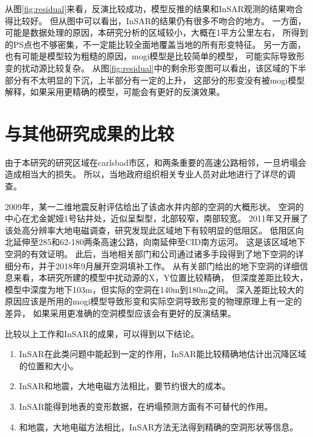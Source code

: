 从图\ref{fig:residual}来看，反演比较成功，模型反推的结果和InSAR观测的结果吻合得比较好。
但从图中可以看出，InSAR的结果仍有很多不吻合的地方。
一方面，可能是数据处理的原因，本研究分析的区域较小，大概在1平方公里左右，
所得到的PS点也不够密集，不一定能比较全面地覆盖当地的所有形变特征。
另一方面，也有可能是模型较为粗糙的原因，mogi模型是比较简单的模型，
可能实际导致形变的扰动源比较复杂。
从图\ref{fig:residual}中的剩余形变图可以看出，该区域的下半部分有不太明显的下沉，上半部分有一定的上升，
这部分的形变没有被mogi模型解释，如果采用更精确的模型，可能会有更好的反演效果。

\section{与其他研究成果的比较}
由于本研究的研究区域在carlsbad市区，和两条重要的高速公路相邻，一旦坍塌会造成相当大的损失。
所以，当地政府组织相关专业人员对此地进行了详尽的调查。

2009年，某一二维地震反射评估给出了该卤水井内部的空洞的大概形状。
空洞的中心在尤金妮娅1号钻井处，近似呈梨型，北部较窄，南部较宽。
2011年又开展了该处高分辨率大地电磁调查\cite{landElectricalResistivitySurvey2011}，研究发现此区域地下有较明显的低阻区。
低阻区向北延伸至285和62-180两条高速公路，向南延伸至CID南方运河。
这是该区域地下空洞的有效证明。
此后，当地相关部门和公司通过诸多手段得到了地下空洞的详细分布，并于2018年9月展开空洞填补工作。
从有关部门给出的地下空洞的详细信息来看，本研究所建的模型中扰动源的X，Y位置比较精确，
但深度差距比较大，模型中深度为地下103m，但实际的空洞在140m到180m之间。
深入差距比较大的原因应该是所用的mogi模型导致形变和实际空洞导致形变的物理原理上有一定的差异，
如果采用更准确的空洞模型应该会有更好的反演结果。

比较以上工作和InSAR的成果，可以得到以下结论。
\begin{enumerate}
    \item InSAR在此类问题中能起到一定的作用，InSAR能比较精确地估计出沉降区域的位置和大小。
    \item InSAR和地震，大地电磁方法相比，要节约很大的成本。
    \item InSAR能得到地表的变形数据，在坍塌预测方面有不可替代的作用。
    \item 和地震，大地电磁方法相比，InSAR方法无法得到精确的空洞形状等信息。
\end{enumerate}